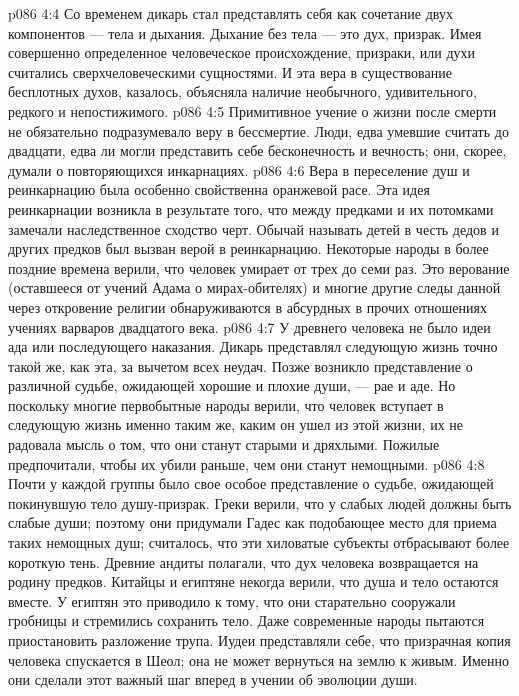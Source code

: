 \vs p086 4:4 Со временем дикарь стал представлять себя как сочетание двух компонентов --- тела и дыхания. Дыхание без тела --- это дух, призрак. Имея совершенно определенное человеческое происхождение, призраки, или духи считались сверхчеловеческими сущностями. И эта вера в существование бесплотных духов, казалось, объясняла наличие необычного, удивительного, редкого и непостижимого.
\vs p086 4:5 \pc Примитивное учение о жизни после смерти не обязательно подразумевало веру в бессмертие. Люди, едва умевшие считать до двадцати, едва ли могли представить себе бесконечность и вечность; они, скорее, думали о повторяющихся инкарнациях.
\vs p086 4:6 Вера в переселение душ и реинкарнацию была особенно свойственна оранжевой расе. Эта идея реинкарнации возникла в результате того, что между предками и их потомками замечали наследственное сходство черт. Обычай называть детей в честь дедов и других предков был вызван верой в реинкарнацию. Некоторые народы в более поздние времена верили, что человек умирает от трех до семи раз. Это верование (оставшееся от учений Адама о мирах\hyp{}обителях) и многие другие следы данной через откровение религии обнаруживаются в абсурдных в прочих отношениях учениях варваров двадцатого века.
\vs p086 4:7 \pc У древнего человека не было идеи ада или последующего наказания. Дикарь представлял следующую жизнь точно такой же, как эта, за вычетом всех неудач. Позже возникло представление о различной судьбе, ожидающей хорошие и плохие души, --- рае и аде. Но поскольку многие первобытные народы верили, что человек вступает в следующую жизнь именно таким же, каким он ушел из этой жизни, их не радовала мысль о том, что они станут старыми и дряхлыми. Пожилые предпочитали, чтобы их убили раньше, чем они станут немощными.
\vs p086 4:8 Почти у каждой группы было свое особое представление о судьбе, ожидающей покинувшую тело душу\hyp{}призрак. Греки верили, что у слабых людей должны быть слабые души; поэтому они придумали Гадес как подобающее место для приема таких немощных душ; считалось, что эти хиловатые субъекты отбрасывают более короткую тень. Древние андиты полагали, что дух человека возвращается на родину предков. Китайцы и египтяне некогда верили, что душа и тело остаются вместе. У египтян это приводило к тому, что они старательно сооружали гробницы и стремились сохранить тело. Даже современные народы пытаются приостановить разложение трупа. Иудеи представляли себе, что призрачная копия человека спускается в Шеол; она не может вернуться на землю к живым. Именно они сделали этот важный шаг вперед в учении об эволюции души.
